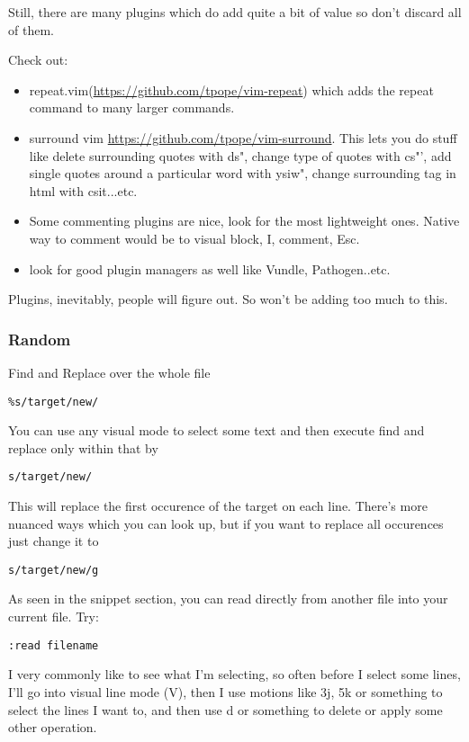 \documentclass[12pt, letterpaper]{article}
\begin{document}
Still, there are many plugins which do add quite a bit of value so don't discard all of them.

Check out: 
\begin{itemize}
    \item repeat.vim(\url{https://github.com/tpope/vim-repeat}) which adds the repeat command to many larger commands.
    \item surround vim \url{https://github.com/tpope/vim-surround}. This lets you do stuff like delete surrounding quotes with ds", change type of quotes with cs"', add single quotes around a particular word with ysiw", change surrounding tag in html with csit...etc.
    \item Some commenting plugins are nice, look for the most lightweight ones. Native way to comment would be to visual block, I, comment, Esc.
    \item look for good plugin managers as well like Vundle, Pathogen..etc.
\end{itemize}


Plugins, inevitably, people will figure out. So won't be adding too much to this.


\subsubsection{Random}
Find and Replace over the whole file
\begin{verbatim}
%s/target/new/
\end{verbatim}

You can use any visual mode to select some text and then execute find and replace only within that by
\begin{verbatim}
s/target/new/
\end{verbatim}
This will replace the first occurence of the target on each line. There's more nuanced ways which you can look up, but if you want to replace all occurences just change it to
\begin{verbatim}
s/target/new/g
\end{verbatim}

As seen in the snippet section, you can read directly from another file into your current file. Try:
\begin{verbatim}
:read filename
\end{verbatim}

I very commonly like to see what I'm selecting, so often before I select some lines, I'll go into visual line mode (V), then I use motions like 3j, 5k or something to select the lines I want to, and then use d or something to delete or apply some other operation.
\end{document}
